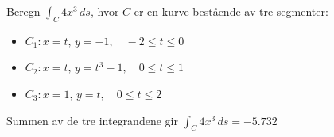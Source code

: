 \begin{eks}{}
Beregn \( \int_C 4x^3\, ds \), hvor \( C \) er en kurve bestående av tre segmenter:
\begin{itemize}
    \item \( C_1: x = t,\, y = -1,\quad -2 \leq t \leq 0 \)
    \item \( C_2: x = t,\, y = t^3 - 1,\quad 0 \leq t \leq 1 \)
    \item \( C_3: x = 1,\, y = t,\quad 0 \leq t \leq 2 \)
\end{itemize}
Summen av de tre integrandene gir \( \int_C 4x^3\, ds = -5.732 \)
\end{eks}
